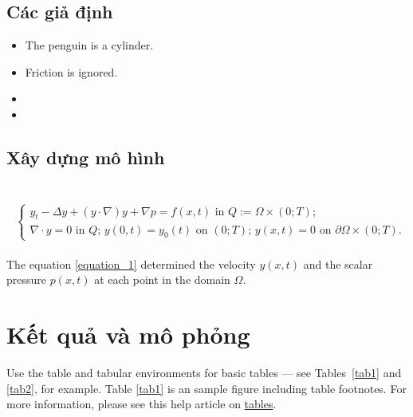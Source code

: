 \documentclass[twoside,12pt]{article}
\begin{document}
\subsection{Các giả định}
\lipsum[2]
\begin{itemize}
    \item The penguin is a cylinder. \lipsum[9][1-3]

    \item Friction is ignored. \lipsum[3][1-3]

    \item \lipsum[4][1-3]

    \item \lipsum[5][1-3]
\end{itemize}

\subsection{Xây dựng mô hình}

\lipsum[3][1-8]\\
\begin{align}\label{equation_1}
    \begin{split}
        \begin{cases}
            y_t - \Delta y + (y \cdot\nabla)y + \nabla p = f(x,t) \text{ in }Q:=\Omega \times (0;T);\\
            \nabla \cdot y = 0 \text{ in }Q; \,y(0,t)=y_0(t) \text{ on }(0;T); \, y(x,t) = 0 \text{ on }\partial\Omega \times (0;T).
        \end{cases}
    \end{split}
\end{align}

The equation \eqref{equation_1} determined the velocity $y(x,t)$ and the scalar pressure $p(x,t)$ at each point in the domain $\Omega$. \lipsum[4]


\section{Kết quả và mô phỏng}
Use the table and tabular environments for basic tables --- see Tables~\ref{tab1} and \ref{tab2}, for example. Table \ref{tab1} is an sample figure including table footnotes. For more information, please see this help article on \href{https://www.overleaf.com/learn/latex/tables}{tables}. 
\end{document}
